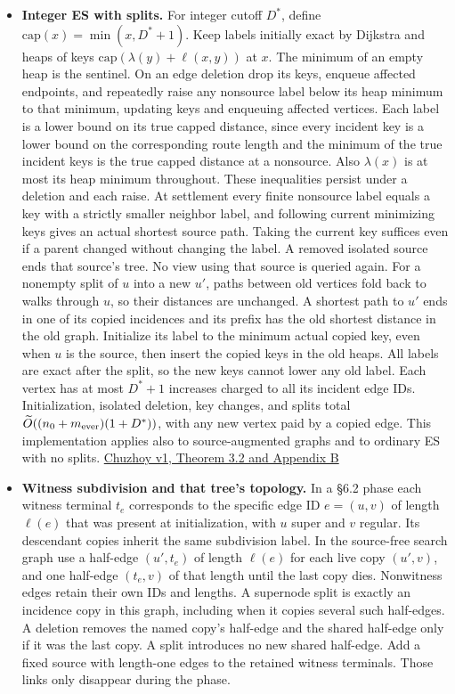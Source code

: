 \documentclass[11pt]{article}
\begin{document}
\begin{itemize}
\item
  \textbf{Integer ES with splits.} For integer cutoff \(D^*\), define \(\mathrm{cap}(x)=\min(x,D^*+1)\). Keep labels initially exact by Dijkstra and heaps of keys \(\mathrm{cap}(\lambda(y)+\ell(x,y))\) at \(x\). The minimum of an empty heap is the sentinel. On an edge deletion drop its keys, enqueue affected endpoints, and repeatedly raise any nonsource label below its heap minimum to that minimum, updating keys and enqueuing affected vertices. Each label is a lower bound on its true capped distance, since every incident key is a lower bound on the corresponding route length and the minimum of the true incident keys is the true capped distance at a nonsource. Also \(\lambda(x)\) is at most its heap minimum throughout. These inequalities persist under a deletion and each raise. At settlement every finite nonsource label equals a key with a strictly smaller neighbor label, and following current minimizing keys gives an actual shortest source path. Taking the current key suffices even if a parent changed without changing the label. A removed isolated source ends that source's tree. No view using that source is queried again. For a nonempty split of \(u\) into a new \(u'\), paths between old vertices fold back to walks through \(u\), so their distances are unchanged. A shortest path to \(u'\) ends in one of its copied incidences and its prefix has the old shortest distance in the old graph. Initialize its label to the minimum actual copied key, even when \(u\) is the source, then insert the copied keys in the old heaps. All labels are exact after the split, so the new keys cannot lower any old label. Each vertex has at most \(D^*+1\) increases charged to all its incident edge IDs. Initialization, isolated deletion, key changes, and splits total \(\widetilde O((n_0+m_{\rm ever})(1+D^*))\), with any new vertex paid by a copied edge. This implementation applies also to source-augmented graphs and to ordinary ES with no splits. \href{https://arxiv.org/pdf/2109.05621v1}{Chuzhoy v1, Theorem 3.2 and Appendix B}
\item
  \textbf{Witness subdivision and that tree's topology.} In a §6.2 phase each witness terminal \(t_e\) corresponds to the specific edge ID \(e=(u,v)\) of length \(\ell(e)\) that was present at initialization, with \(u\) super and \(v\) regular. Its descendant copies inherit the same subdivision label. In the source-free search graph use a half-edge \((u',t_e)\) of length \(\ell(e)\) for each live copy \((u',v)\), and one half-edge \((t_e,v)\) of that length until the last copy dies. Nonwitness edges retain their own IDs and lengths. A supernode split is exactly an incidence copy in this graph, including when it copies several such half-edges. A deletion removes the named copy's half-edge and the shared half-edge only if it was the last copy. A split introduces no new shared half-edge. Add a fixed source with length-one edges to the retained witness terminals. Those links only disappear during the phase.


\end{itemize}
\end{document}
